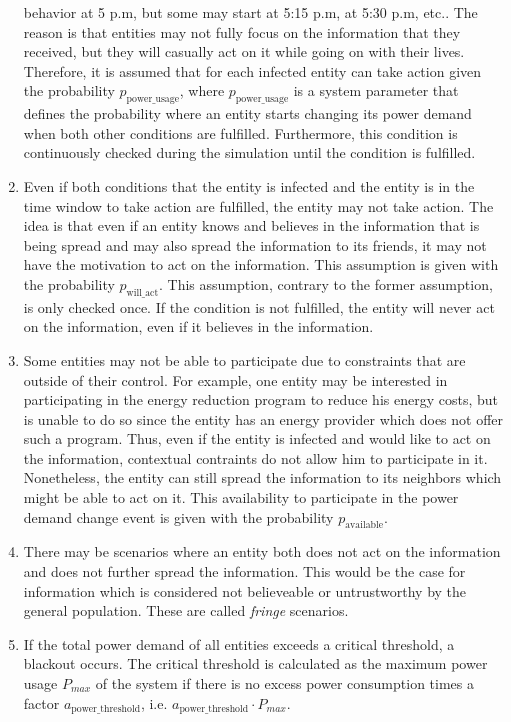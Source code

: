 \begin{enumerate}
    behavior at 5 p.m, but some may start at 5:15 p.m, at 5:30 p.m, etc..
    The reason is that entities may not fully focus on the information
    that they received, but they will casually act on it while going 
    on with their lives. 
    Therefore, it is assumed that for each infected entity can 
    take action given the probability $p_{\mathrm{power\_usage}}$, where 
    $p_{\mathrm{power\_usage}}$ is a system
    parameter that defines the probability where an entity
    starts changing its power demand when both other conditions are
    fulfilled. Furthermore, this condition is continuously checked 
    during the simulation until the condition is fulfilled.
    \item Even if both conditions that
    the entity is infected and the entity is in the time window 
    to take action are fulfilled, the entity may not take action.
    The idea is that even if an entity knows and believes
    in the information that is being spread and may also spread
    the information to its friends, it may not have the motivation 
    to act on the information.
    This assumption is given with the probability $p_{\mathrm{will\_act}}$.
    This assumption, contrary to the former assumption, is only
    checked once. If the condition is not fulfilled, the 
    entity will never act on the information, even if 
    it believes in the information.
    \item Some entities may not be able to participate due 
    to constraints that are outside of their control. For example, 
    one entity may be interested in participating in the energy reduction
    program to reduce his energy costs, but is unable to do so since 
    the entity has an energy provider which does not offer such a program.
    Thus, even if the entity is infected and would like to act on the 
    information, contextual contraints do not allow him to participate in it.
    Nonetheless, the entity can still spread the information to its neighbors
    which might be able to act on it. 
    This availability to participate in the power demand change event is 
    given with the probability $p_{\mathrm{available}}$.
    \item There may be scenarios where 
    an entity both does not act on the information and does not further
    spread the information. This would be the case for information
    which is considered not believeable or untrustworthy by the general
    population. These are called \textit{fringe} scenarios.
    \item If the total power demand of all entities exceeds a 
    critical threshold, a blackout occurs. The critical threshold
    is calculated as the maximum power usage $P_{max}$ 
    of the system if there is no excess power consumption times 
    a factor $a_{\mathrm{power\_threshold}}$, i.e.
    $a_{\mathrm{power\_threshold}} \cdot P_{max}$.
\end{enumerate}

